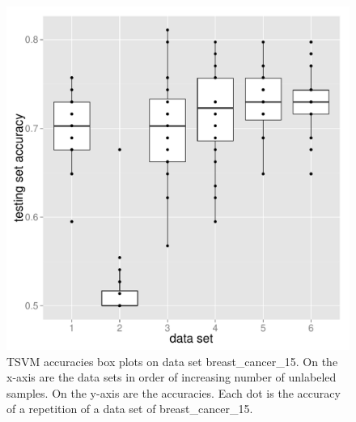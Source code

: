 \begin{figure}
\begin{centering}
\includegraphics[width=0.68\columnwidth]{images/breast_cancer_15-accuracies-svmlight.pdf}
\par\end{centering}
\caption[TSVM accuracies box plots on data set breast\_cancer\_15.]{\label{fig:Accuracy-box-plots-of-breast_cancer_15}TSVM accuracies
box plots on data set breast\_cancer\_15. On the x-axis are the data
sets in order of increasing number of unlabeled samples. On the y-axis
are the accuracies. Each dot is the accuracy of a repetition of a
data set of breast\_cancer\_15.}
\end{figure}

